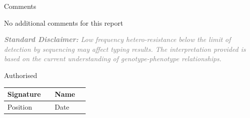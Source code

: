 \documentclass[12pt]{article}
\begin{document}
\begin{reportSection}{Comments}
\vspace{1mm}

\footnotesize{No additional comments for this report}
\vspace{2mm}

\textcolor{gray}{\footnotesize{\textit{\textbf{Standard Disclaimer:} Low frequency hetero-resistance below the limit of detection by sequencing may affect typing results.  The interpretation provided is based on the current understanding of genotype-phenotype relationships.}}}

\end{reportSection}
\vspace{1mm}




\begin{reportSection}{Authorised}
\vspace{1mm}
\tabulinesep=5pt
\noindent 
{}
\noindent \begin{tabu} to \textwidth {|XU||XU|}
\hline
Signature  &   & Name  &   \\ \hline
Position   &   & Date    &        \\ \hline
\end{tabu}

\end{reportSection}
\end{document}
